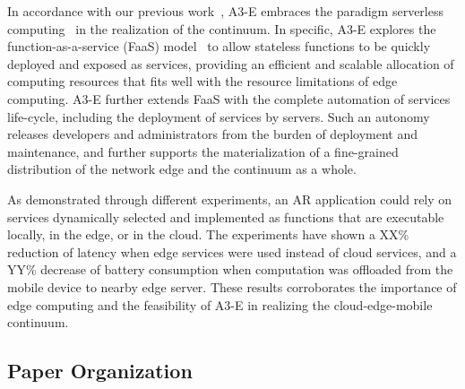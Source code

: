 
In accordance with our previous work~\cite{GarrigaMendonca2017}, A3-E embraces the paradigm serverless computing~\cite{Hendrickson:2016,baldini2017serverless} in the realization of the continuum. In specific, A3-E explores the function-as-a-service (FaaS) model~\cite{MateosFaaster17} to allow stateless functions to be quickly deployed and exposed as services, providing an efficient and scalable allocation of computing resources that fits well with the resource limitations of edge computing. A3-E further extends FaaS with the complete automation of services life-cycle, including the deployment of services by servers. Such an autonomy releases developers and administrators from the burden of deployment and maintenance, and further supports the materialization of a fine-grained distribution of the network edge and the continuum as a whole.


As demonstrated through different experiments, an AR application could rely on services dynamically selected and implemented as functions that are executable locally, in the edge, or in the cloud. The experiments have shown a XX\% reduction of latency when edge services were used instead of cloud services, and a YY\% decrease of battery consumption when computation was offloaded from the mobile device to nearby edge server. These results corroborates the importance of edge computing and the feasibility of A3-E in realizing the cloud-edge-mobile continuum.




\subsection*{Paper Organization}

